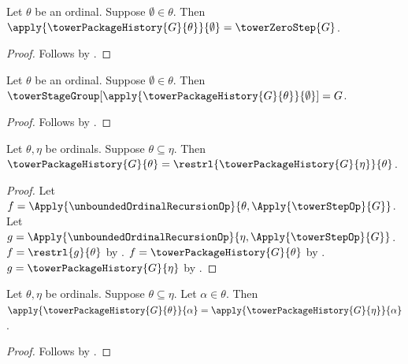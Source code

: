 \begin{proposition}\label{tower_package_history_zero_value}
    Let $\theta$ be an ordinal.
    Suppose $\emptyset\in\theta$.
    Then $\apply{\towerPackageHistory{G}{\theta}}{\emptyset}=
        \towerZeroStep{G}$.
\end{proposition}
\begin{proof}
    Follows by
        .
\end{proof}

\begin{proposition}\label{tower_package_history_zero_group}
    Let $\theta$ be an ordinal.
    Suppose $\emptyset\in\theta$.
    Then $\towerStageGroup[
        \apply{\towerPackageHistory{G}{\theta}}{\emptyset}]=G$.
\end{proposition}
\begin{proof}
    Follows by
        .
\end{proof}

\begin{theorem}\label{tower_package_history_segment}
    Let $\theta,\eta$ be ordinals.
    Suppose $\theta\subseteq\eta$.
    Then $\towerPackageHistory{G}{\theta}=
        \restrl{\towerPackageHistory{G}{\eta}}{\theta}$.
\end{theorem}
\begin{proof}
    Let $f=\Apply{\unboundedOrdinalRecursionOp}
        {\theta,\Apply{\towerStepOp}{G}}$.
    Let $g=\Apply{\unboundedOrdinalRecursionOp}
        {\eta,\Apply{\towerStepOp}{G}}$.
    $f=\restrl{g}{\theta}$ by
        .
    $f=\towerPackageHistory{G}{\theta}$ by
        .
    $g=\towerPackageHistory{G}{\eta}$ by
        .
\end{proof}

\begin{theorem}\label{tower_package_history_value_stability}
    Let $\theta,\eta$ be ordinals.
    Suppose $\theta\subseteq\eta$.
    Let $\alpha\in\theta$.
    Then $\apply{\towerPackageHistory{G}{\theta}}{\alpha}=
        \apply{\towerPackageHistory{G}{\eta}}{\alpha}$.
\end{theorem}
\begin{proof}
    Follows by
        .
\end{proof}

